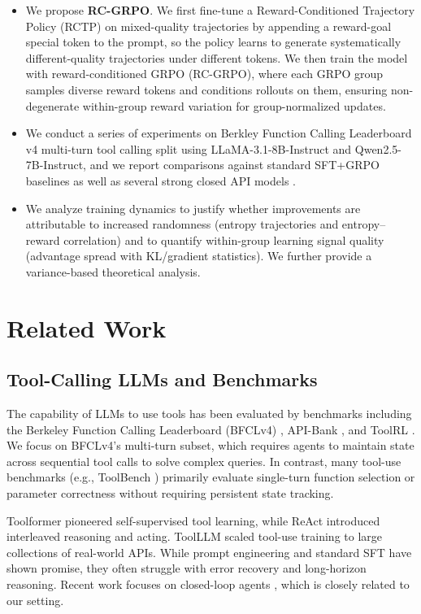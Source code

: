 \documentclass{article}
\theoremstyle{plain}
\theoremstyle{definition}
\theoremstyle{remark}
\begin{document}
\begin{itemize}
    \item We propose \textbf{RC-GRPO}. We first fine-tune a Reward-Conditioned Trajectory Policy (RCTP) on mixed-quality trajectories by appending a reward-goal special token to the prompt, so the policy learns to generate systematically different-quality trajectories under different tokens. We then train the model with reward-conditioned GRPO (RC-GRPO), where each GRPO group samples diverse reward tokens and conditions rollouts on them, ensuring non-degenerate within-group reward variation for group-normalized updates.
    \item We conduct a series of experiments on Berkley Function Calling Leaderboard v4 multi-turn tool calling split using LLaMA-3.1-8B-Instruct and Qwen2.5-7B-Instruct, and we report comparisons against standard SFT+GRPO baselines as well as several strong closed API models .
    \item We analyze training dynamics to justify whether improvements are attributable to increased randomness (entropy trajectories and entropy--reward correlation) and to quantify within-group learning signal quality (advantage spread with KL/gradient statistics). We further provide a variance-based theoretical analysis.
\end{itemize}


\section{Related Work}

\subsection{Tool-Calling LLMs and Benchmarks}
The capability of LLMs to use tools has been evaluated by benchmarks including the Berkeley Function Calling Leaderboard (BFCLv4) \cite{bfcl2024,gorilla2023}, API-Bank \cite{li2023apibank}, and ToolRL \cite{toolrl2024}. We focus on BFCLv4's multi-turn subset, which requires agents to maintain state across sequential tool calls to solve complex queries. In contrast, many tool-use benchmarks (e.g., ToolBench \cite{xu2023toolbench}) primarily evaluate single-turn function selection or parameter correctness without requiring persistent state tracking.

Toolformer \cite{schick2023toolformer} pioneered self-supervised tool learning, while ReAct \cite{yao2023react} introduced interleaved reasoning and acting. ToolLLM \cite{qin2023toolllm} scaled tool-use training to large collections of real-world APIs. While prompt engineering and standard SFT have shown promise, they often struggle with error recovery and long-horizon reasoning. Recent work focuses on closed-loop agents \cite{xi2023rise,wang2024executable}, which is closely related to our setting.
\end{document}

